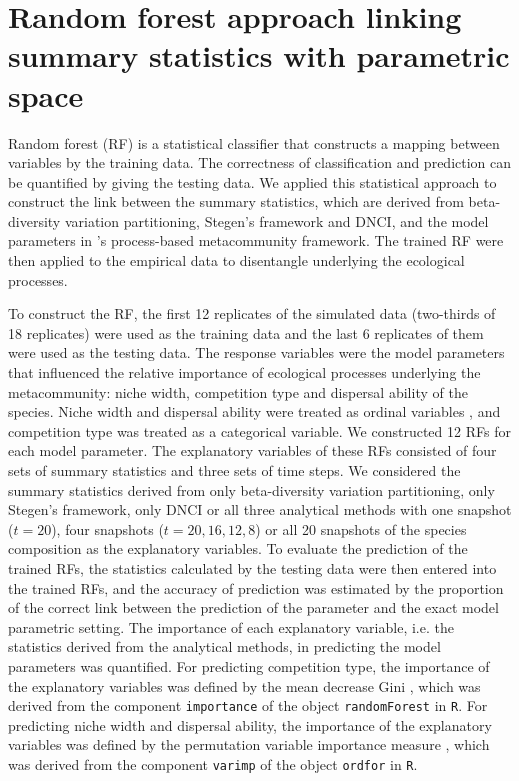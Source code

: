 	\section{Random forest approach linking summary statistics with parametric space}
	\noindent
	Random forest (RF) is a statistical classifier that constructs a mapping between variables by the training data. The correctness of classification and prediction can be quantified by giving the testing data. We applied this statistical approach to construct the link between the summary statistics, which are derived from beta-diversity variation partitioning, Stegen's framework and DNCI, and the model parameters in \citeauthor{thompson2020process}'s process-based metacommunity framework. The trained RF were then applied to the empirical data to disentangle underlying the ecological processes.
	
	
	To construct the RF, the first 12 replicates of the simulated data (two-thirds of 18 replicates) were used as the training data and the last 6 replicates of them were used as the testing data. The response variables were the model parameters that influenced the relative importance of ecological processes underlying the metacommunity: niche width, competition type and dispersal ability of the species. Niche width and dispersal ability were treated as ordinal variables \citep{hornung2020ordinal}, and competition type was treated as a categorical variable. We constructed 12 RFs for each model parameter. The explanatory variables of these RFs consisted of four sets of summary statistics and three sets of time steps. We considered the summary statistics derived from only beta-diversity variation partitioning, only Stegen's framework, only DNCI or all three analytical methods with one snapshot ($t = 20$), four snapshots ($t = 20, 16, 12, 8$) or all 20 snapshots of the species composition as the explanatory variables. To evaluate the prediction of the trained RFs, the statistics calculated by the testing data were then entered into the trained RFs, and the accuracy of prediction was estimated by the proportion of the correct link between the prediction of the parameter and the exact model parametric setting. The importance of each explanatory variable, i.e. the statistics derived from the analytical methods, in predicting the model parameters was quantified. For predicting competition type, the importance of the explanatory variables was defined by the mean decrease Gini \citep{han2016variable}, which was derived from the component \texttt{importance} of the object \texttt{randomForest} in \texttt{R}. For predicting niche width and dispersal ability, the importance of the explanatory variables was defined by the permutation variable importance measure \citep{janitza2016random}, which was derived from the component \texttt{varimp} of the object \texttt{ordfor} in \texttt{R}.
	
